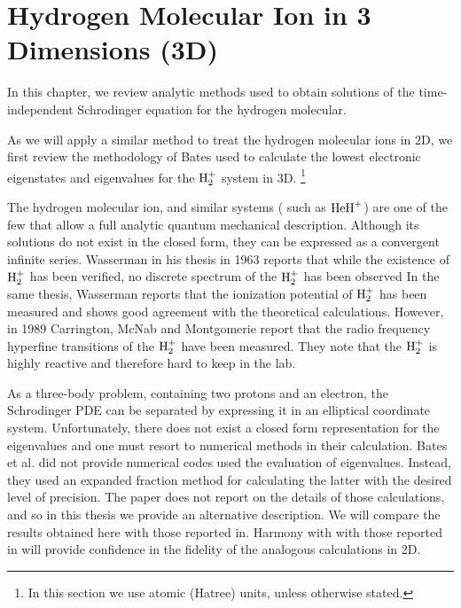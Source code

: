 \chapter{Hydrogen Molecular Ion in 3 Dimensions (3D) }

In this chapter, we review analytic methods\cite{Bates1}\cite{Bates2}\cite{Slater} used to obtain 
solutions of the time-independent Schrodinger equation for 
the hydrogen molecular.

As we will apply a similar method to treat the hydrogen molecular ions in 2D,
we first review the methodology of Bates used to calculate the lowest electronic eigenstates and eigenvalues for the $ {\rm H}_2^{+} $ system in 3D. \footnote {In this section we
use atomic (Hatree) units, unless otherwise stated.}

The hydrogen molecular ion, and similar systems ( such as $ {\rm HeH}^{+} $) are one of the few that allow a full analytic quantum mechanical description. Although its
solutions do not exist in the closed form, they can be expressed as a convergent infinite series.  Wasserman in his thesis \cite{ExperimentalBates2} in 1963 reports that while the existence of $ {\rm H}_2^{+} $ has been verified, no  discrete spectrum of the  $ {\rm H}_2^{+} $ has been observed  In the same thesis, Wasserman reports that the ionization potential of $ {\rm H}_2^{+} $ has been measured and shows good agreement with the theoretical calculations. However, in 1989 Carrington, McNab and Montgomerie report \cite{ExperimentalBates3} that the radio frequency hyperfine transitions of the $ {\rm H}_2^{+} $ have been measured. They note that the $ {\rm H}_2^{+} $  is highly reactive and therefore hard to keep in the lab.

As a three-body problem, containing two protons and an electron,
the Schrodinger PDE can be separated by expressing it in an elliptical coordinate system. Unfortunately, there does not exist a closed form representation for the eigenvalues and one must resort to numerical methods in their calculation.
Bates et al. \cite{Bates1}\cite{Bates2} did not provide numerical codes used the evaluation of eigenvalues. Instead, they used an expanded fraction method for calculating the latter with the desired level of precision. The paper\cite{Bates2} does not report on the details of those calculations, and so in this thesis we provide an alternative description. We will compare
 the results obtained here with those reported in\cite{Bates2}. Harmony with with those reported in\cite{Bates2} will provide 
 confidence in the fidelity of the analogous calculations in 2D.

